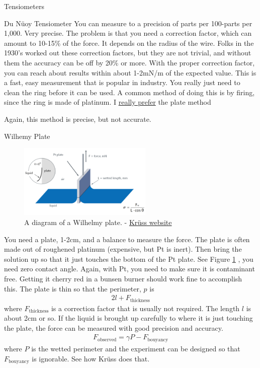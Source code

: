 \documentclass{article}
\begin{document}
\begin{section}{Tensiometers}
\begin{subsection}{Du N\"uoy Tensiometer}
	You can measure to a precision of parts per 100-parts per 1,000. Very precise. The problem is that you need a correction factor, which can amount to 10-15\% of the force. It depends on the radius of the wire. Folks in the 1930's worked out these correction factors, but they are not trivial, and without them the accuracy can be off by 20\% or more. With the proper correction factor, you can reach about results within about 1-2mN/m of the expected value. This is a fast, easy measurement that is popular in industry. You really just need to clean the ring before it can be used. A common method of doing this is by firing, since the ring is made of platinum. I \underline{really prefer} the plate method

	Again, this method is precise, but not accurate.
\end{subsection}
\begin{subsection}{Wilhemy Plate}
	\begin{figure}[h]
		\centering
		\includegraphics[height=100pt]{Wilhelmy_plate}
		\caption{A diagram of a Wilhelmy plate.	- \href{http://www.kruss.de/services/education-theory/glossary/wilhelmy-plate-method/}{Kr\"uss website}}
		\label{fig:wilhelmy}
	\end{figure}

You need a plate, 1-2cm, and a balance to measure the force. The plate is often made out of roughened platinum (expensive, but Pt is inert). Then bring the solution up so that it just touches the bottom of the Pt plate. See Figure \ref{fig:wilhelmy}
, you need zero contact angle. Again, with Pt, you need to make sure it is contaminant free. Getting it cherry red in a bunsen burner should work fine to accomplish this.  The plate is thin so that the perimeter, $p$ is
\begin{align*}
	2l+F_\text{thickness}
\end{align*}
where $F_\text{thickness}$ is a correction factor that is usually not required. The length $l$ is about 2cm or so. If the liquid is brought up carefully to where it is just touching the plate, the force can be measured with good precision and accuracy.
\begin{align*}
	F_\text{observed} = \gamma P - F_\text{bouyancy}
\end{align*}
where $P$ is the wetted perimeter and the experiment can be designed so that $F_\text{bouyancy}$ is ignorable. See how Kr\"uss does that.


\end{subsection}
\end{section}
\end{document}
